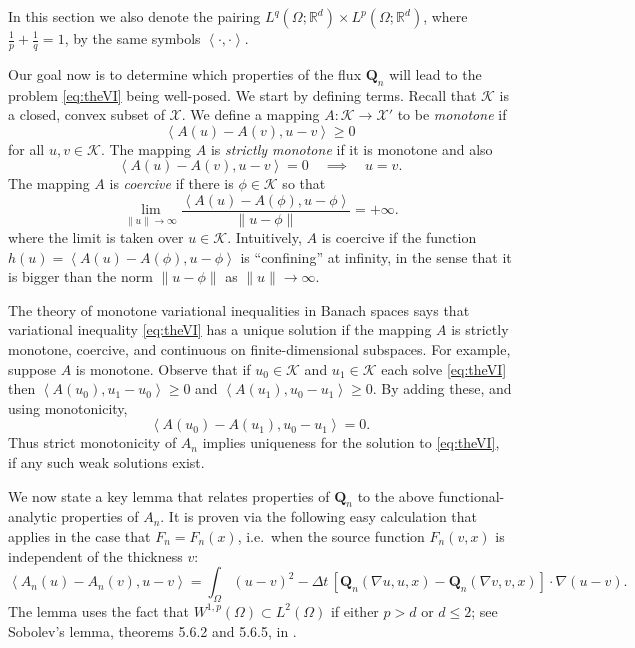 \documentclass[final,leqno,onefignum,onetabnum]{siamltex1213bueler}
\newcommand\bQ{\mathbf{Q}}
\renewcommand{\grad}{\nabla}
\newcommand{\ip}[2]{\ensuremath{\left<#1,#2\right>}}
\newcommand\RR{\mathbb{R}}
\begin{document}
In this section we also denote the pairing $L^q(\Omega;\RR^d) \times L^p(\Omega;\RR^d)$, where $\frac{1}{p}+\frac{1}{q}=1$, by the same symbols $\ip{\cdot}{\cdot}$.

Our goal now is to determine which properties of the flux $\bQ_n$ will lead to the problem \eqref{eq:theVI} being well-posed.  We start by defining terms.  Recall that $\mathcal{K}$ is a closed, convex subset of $\mathcal{X}$.  We define a mapping $A : \mathcal{K} \to \mathcal{X}'$ to be \emph{monotone} if
    $$\ip{A(u) - A(v)}{u-v} \ge 0$$
for all $u,v\in\mathcal{K}$.  The mapping $A$ is \emph{strictly monotone} if it is monotone and also
    $$\ip{A(u) - A(v)}{u-v} = 0 \quad \implies \quad u=v.$$
The mapping $A$ is \emph{coercive} if there is $\phi\in \mathcal{K}$ so that
    $$\lim_{\|u\|\to\infty} \frac{\ip{A(u) - A(\phi)}{u-\phi}}{\|u-\phi\|} = +\infty.$$
where the limit is taken over $u\in\mathcal{K}$.  Intuitively, $A$ is coercive if the function $h(u)=\ip{A(u) - A(\phi)}{u-\phi}$ is ``confining'' at infinity, in the sense that it is bigger than the norm $\|u-\phi\|$ as $\|u\|\to\infty$.

The theory of monotone variational inequalities in Banach spaces \cite[chapter III]{KinderlehrerStampacchia} says that variational inequality \eqref{eq:theVI} has a unique solution if the mapping $A$ is strictly monotone, coercive, and continuous on finite-dimensional subspaces.  For example, suppose $A$ is monotone.  Observe that if $u_0 \in \mathcal{K}$ and $u_1 \in \mathcal{K}$ each solve \eqref{eq:theVI} then $\ip{A(u_0)}{u_1-u_0} \ge 0$ and $\ip{A(u_1)}{u_0-u_1} \ge 0$.  By adding these, and using monotonicity,
    $$\ip{A(u_0) - A(u_1)}{u_0 - u_1} = 0.$$
Thus strict monotonicity of $A_n$ implies uniqueness for the solution to \eqref{eq:theVI}, if any such weak solutions exist.

We now state a key lemma that relates properties of $\bQ_n$ to the above functional-analytic properties of $A_n$.  It is proven via the following easy calculation that applies in the case that $F_n=F_n(x)$, i.e.~when the source function $F_n(v,x)$ is independent of the thickness $v$:
   $$\ip{A_n(u) - A_n(v)}{u-v} = \int_\Omega (u-v)^2 - \Delta t\, \left[\bQ_n(\grad u,u,x) - \bQ_n(\grad v,v,x)\right] \cdot \grad(u-v).$$
The lemma uses the fact that $W^{1,p}(\Omega) \subset L^2(\Omega)$ if either $p>d$ or $d\le 2$; see Sobolev's lemma, theorems 5.6.2 and 5.6.5, in \cite{Evans}.
\end{document}
